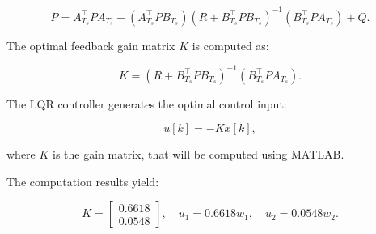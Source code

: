 \[
P = A_{T_s}^\top P A_{T_s} - \left(A_{T_s}^\top P B_{T_s} \right) 
\left(R + B_{T_s}^\top P B_{T_s} \right)^{-1} 
\left(B_{T_s}^\top P A_{T_s} \right) + Q.
\]

The optimal feedback gain matrix \( K \) is computed as:

\[
K = \left( R + B_{T_s}^\top P B_{T_s} \right)^{-1} \left(B_{T_s}^\top P A_{T_s} \right).
\]

The LQR controller generates the optimal control input:

\[
u[k] = -K x[k],
\]

where \( K \) is the gain matrix, that will be computed using MATLAB.

The computation results yield:

\[
K = \begin{bmatrix}
0.6618 \\ 0.0548
\end{bmatrix}, \quad u_{1} = 0.6618 w_{1}, \quad u_{2} = 0.0548 w_{2}.
\]
